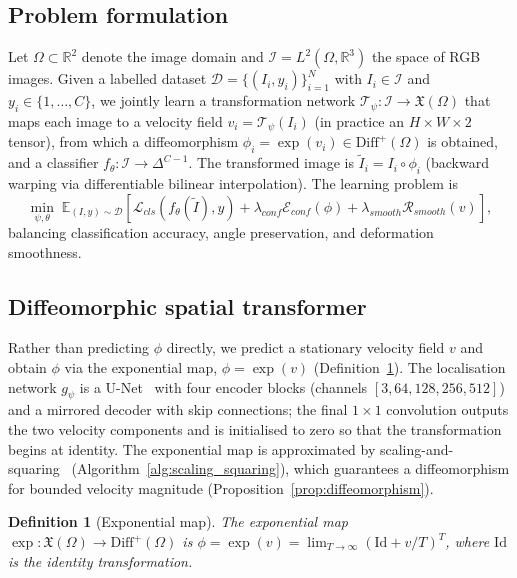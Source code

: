 \documentclass[pdflatex,sn-nature]{sn-jnl}%
\theoremstyle{thmstyleone}%
\theoremstyle{thmstyletwo}%
\theoremstyle{thmstylethree}%
\newtheorem{definition}{Definition}%
\begin{document}
\subsection{Problem formulation}

Let $\Omega\subset\mathbb{R}^2$ denote the image domain and
$\mathcal{I}=L^2(\Omega,\mathbb{R}^3)$ the space of RGB images. Given a labelled
dataset $\mathcal{D}=\{(I_i,y_i)\}_{i=1}^N$ with $I_i\in\mathcal{I}$ and
$y_i\in\{1,\ldots,C\}$, we jointly learn a transformation network
$\mathcal{T}_\psi:\mathcal{I}\rightarrow\mathfrak{X}(\Omega)$ that maps each image
to a velocity field $v_i=\mathcal{T}_\psi(I_i)$ (in practice an $H\times W\times2$
tensor), from which a diffeomorphism $\phi_i=\exp(v_i)\in\text{Diff}^+(\Omega)$ is
obtained, and a classifier $f_\theta:\mathcal{I}\rightarrow\Delta^{C-1}$. The
transformed image is $\tilde{I}_i=I_i\circ\phi_i$ (backward warping via
differentiable bilinear interpolation). The learning problem is
\begin{equation}
\min_{\psi,\theta}\;\mathbb{E}_{(I,y)\sim\mathcal{D}}\left[\mathcal{L}_{cls}(f_\theta(\tilde{I}),y)+\lambda_{conf}\mathcal{E}_{conf}(\phi)+\lambda_{smooth}\mathcal{R}_{smooth}(v)\right],
\label{eq:objective}
\end{equation}
balancing classification accuracy, angle preservation, and deformation
smoothness.

\subsection{Diffeomorphic spatial transformer}

Rather than predicting $\phi$ directly, we predict a stationary velocity field
$v$ and obtain $\phi$ via the exponential map, $\phi=\exp(v)$
(Definition~\ref{def:exp_map}). The localisation network $g_\psi$ is a
U-Net~\cite{ronneberger2015unet} with four encoder blocks (channels
$[3,64,128,256,512]$) and a mirrored decoder with skip connections; the final
$1\times1$ convolution outputs the two velocity components and is initialised to
zero so that the transformation begins at identity. The exponential map is
approximated by scaling-and-squaring~\cite{arsigny2006logdiff}
(Algorithm~\ref{alg:scaling_squaring}), which guarantees a diffeomorphism for
bounded velocity magnitude (Proposition~\ref{prop:diffeomorphism}).

\begin{definition}[Exponential map]
\label{def:exp_map}
The exponential map $\exp:\mathfrak{X}(\Omega)\rightarrow\text{Diff}^+(\Omega)$ is
$\phi=\exp(v)=\lim_{T\rightarrow\infty}\left(\text{Id}+v/T\right)^T$, where
$\text{Id}$ is the identity transformation.
\end{definition}
\end{document}
